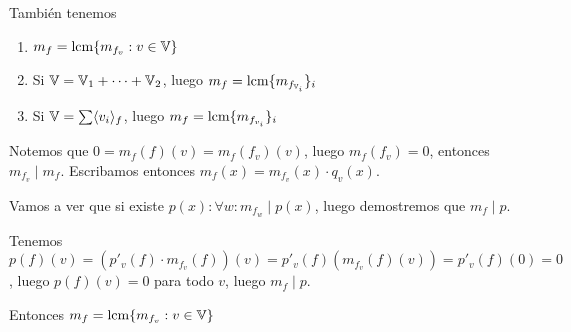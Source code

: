\documentclass{article}
\begin{document}
También tenemos
\begin{enumerate}
	\item $m_f = \operatorname{lcm} \{m_{f_v} : v \in \mathbb{V}\}$
	\item Si $\mathbb{V} = \mathbb{V}_1 + \dots + \mathbb{V}_2$, luego $m_f = \operatorname{lcm} \{m_{f_{\mathbb{V}_i}}\}_i$
	\item Si $\mathbb{V} = \sum \langle v_i \rangle_f$, luego $m_f = \operatorname{lcm} \{m_{f_{v_i}}\}_i$
\end{enumerate}

Notemos que $0 = m_f(f)(v) = m_f(f_v)(v)$, luego $m_f(f_v) = 0$, entonces $m_{f_v} \mid m_f$. Escribamos entonces $m_f(x) = m_{f_v}(x) \cdot q_v(x)$.

Vamos a ver que si existe $p(x) : \forall w : m_{f_w} \mid p(x)$, luego demostremos que $m_f \mid p$.

Tenemos $p(f)(v) = (p'_v(f) \cdot m_{f_v}(f)) (v) = p'_v(f) (m_{f_v}(f)(v)) = p'_v(f)(0) = 0$, luego $p(f)(v) = 0$ para todo $v$, luego $m_f \mid p$.

Entonces $m_f = \operatorname{lcm} \{m_{f_v} : v \in \mathbb{V}\}$
\end{document}
